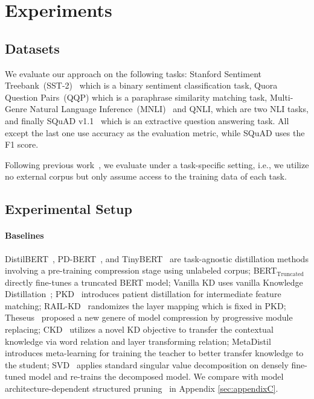 \section{Experiments}
\subsection{Datasets}
We evaluate our approach on the following tasks: Stanford Sentiment Treebank~(SST-2)~\cite{sst2} which is 
a binary sentiment classification task,
Quora Question Pairs~(QQP) which is a paraphrase similarity matching task,
Multi-Genre Natural Language Inference~(MNLI)~\cite{mnli} and QNLI, which are two NLI tasks, 
and finally SQuAD v1.1~\cite{qnliandsquad} which is an extractive 
question answering task. All except the last one use accuracy as the evaluation metric, while SQuAD
uses the F1 score.

Following previous work~\cite{pkd,theseus}, we evaluate under a task-specific setting, i.e., we utilize no external corpus but only assume access to the training data of each task.


\subsection{Experimental Setup}
 \paragraph{Baselines}
 DistilBERT~\cite{distilbert}, PD-BERT~\cite{pdbert}, and  TinyBERT~\cite{tinybert} are  task-agnostic distillation methods involving a pre-training compression stage using unlabeled corpus; BERT$_\text{Truncated}$ directly fine-tunes a truncated BERT model; Vanilla KD uses vanilla Knowledge Distillation~\cite{kd}; PKD~\cite{pkd} introduces patient distillation for intermediate feature matching; RAIL-KD~\cite{rail} randomizes the layer mapping which is fixed in PKD; Theseus~\cite{theseus} proposed a new genere of model compression by progressive module replacing; CKD~\cite{CKD} utilizes a novel KD objective to transfer the contextual knowledge via word relation and layer transforming relation; MetaDistil~\cite{metadistil} introduces meta-learning for training the teacher to better transfer knowledge to the student; SVD~\cite{svd} applies standard singular value decomposition on densely fine-tuned model and re-trains the decomposed model. We  compare with model architecture-dependent structured pruning~\cite{l0} in Appendix \ref{sec:appendixC}.

